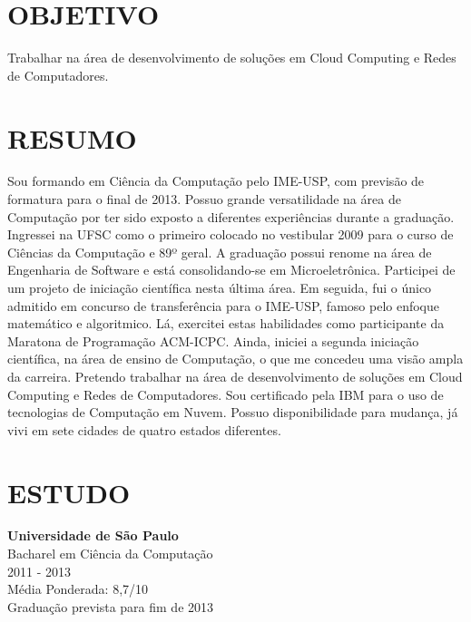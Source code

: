 \documentclass[margin=<value>,11pt]{res} %
\begin{document}

\address{R. Indiana, 998 -- São Paulo, SP 04562-001\\
        (11) 97132-1145, (11) 2389-7150 \\ \texttt{pedro@vezza.com.br}}

\begin{resume}
 
\section{OBJETIVO}  
     Trabalhar na área de desenvolvimento de soluções em Cloud Computing e Redes de Computadores.
 
\section{RESUMO}
Sou formando em Ciência da Computação pelo IME-USP, com previsão de formatura para o final de 2013. Possuo grande versatilidade na área de Computação por ter sido exposto a diferentes experiências durante a graduação. Ingressei na UFSC como o primeiro colocado no vestibular 2009 para o curso de Ciências da Computação e 89º geral. A graduação possui renome na área de Engenharia de Software e está consolidando-se em Microeletrônica. Participei de um projeto de iniciação científica nesta última área. Em seguida, fui o único admitido em concurso de transferência para o IME-USP, famoso pelo enfoque matemático e algoritmico. Lá, exercitei estas habilidades como participante da Maratona de Programação ACM-ICPC. Ainda, iniciei a segunda iniciação científica, na área de ensino de Computação, o que me concedeu uma visão ampla da carreira. Pretendo trabalhar na área de desenvolvimento de soluções em Cloud Computing e Redes de Computadores. Sou certificado pela IBM para o uso de tecnologias de Computação em Nuvem. Possuo disponibilidade para mudança, já vivi em sete cidades de quatro estados diferentes.

\section{ESTUDO} 
	{\bf Universidade de São Paulo}\\
	Bacharel em Ciência da Computação \\
	2011 - 2013 \\
	Média Ponderada: 8,7/10 \\
	Graduação prevista para fim de 2013


\end{resume}
\end{document}
